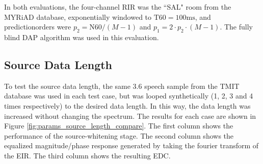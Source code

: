 In both evaluations, the four-channel RIR was the ``SAL" room from the MYRiAD database, exponentially windowed to $\mathrm{T60} = 100 \unit{\milli\second}$, and predictionorders were $p_2 = \mathrm{N60} / \left(M-1\right)$ and $p_1 = 2 \cdot p_2 \cdot \left(M-1\right)$. The fully blind DAP algorithm was used in this evaluation.


\subsection{Source Data Length} \label{section:params_source_length}

To test the source data length, the same \qty{3.6}{\sec} speech sample from the TMIT database was used in each test case, but was looped synthetically (1, 2, 3 and 4 times respectively) to the desired data length. In this way, the data length was increased without changing the spectrum. The results for each case are shown in Figure \ref{fig:params_source_length_compare}. The first column shows the performance of the source-whitening stage. The second column shows the equalized magnitude/phase response generated by taking the fourier transform of the EIR. The third column shows the resulting EDC.




